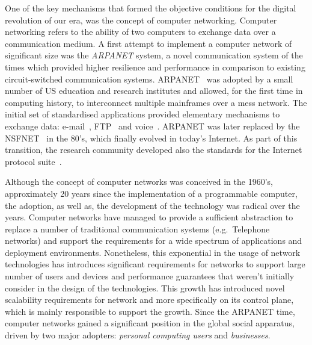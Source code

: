 
One of the key mechanisms that formed the objective conditions for the digital
revolution of our era, was the concept of computer networking.  Computer
networking refers to the ability of two computers to exchange data over a
communication medium. A first attempt to implement a computer network of
significant size was the {\it ARPANET} \/system, a novel communication system of
the times which provided higher resilience and performance in comparison to
existing circuit-switched communication systems.  ARPANET~\cite{beranek81} was
adopted by a small number of US education and research institutes and allowed,
for the first time in computing history, to interconnect multiple mainframes
over a mess network. The initial set of standardised applications provided
elementary mechanisms to exchange data: e-mail~\cite{RFC0561},
FTP~\cite{RFC0354} and voice~\cite{RFC0741}. ARPANET was later replaced by the
NSFNET~\cite{Mills:1987tt} in the 80's, which finally evolved in today's
Internet.  As part of this transition, the research community developed also the
standards for the Internet protocol suite~\cite{Clark:1988}.

Although the concept of computer networks was conceived in the 1960's,
approximately 20 years since the implementation of a programmable computer, the
adoption, as well as, the development of the technology was radical over the
years. Computer networks have managed to provide a sufficient abstraction to
replace a number of traditional communication systems (e.g.~Telephone networks)
and support the requirements for a wide spectrum of applications and deployment
environments. Nonetheless, this exponential in the usage of network technologies
has introduces significant requirements for networks to support large number of
users and devices and performance guarantees that weren't initially consider in
the design of the technologies. This growth has introduced novel scalability
requirements for network and more specifically on its control plane, which is
mainly responsible to support the growth.  Since the ARPANET time, computer
networks gained a significant position in the global social apparatus, driven by
two major adopters: {\it personal computing users} and {\it businesses}.

